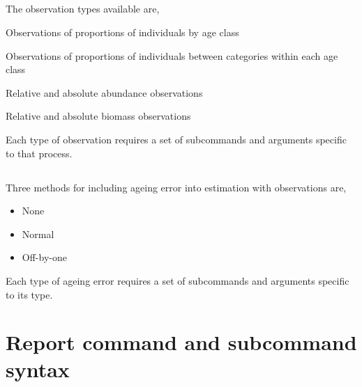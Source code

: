 
\subsection{}

The observation types available are,

\begin{description}
  \item Observations of proportions of individuals by age class
  \item Observations of proportions of individuals between categories within each age class
  \item Relative and absolute abundance observations
  \item Relative and absolute biomass observations
\end{description}

Each type of observation requires a set of subcommands and arguments specific to that process.



\subsection{}


\subsection{}

Three methods for including ageing error into estimation with observations are,

\begin{itemize}
	\item None
	\item Normal
	\item Off-by-one
\end{itemize}

Each type of ageing error requires a set of subcommands and arguments specific to its type.



\section{Report command and subcommand syntax\label{sec:report-syntax}}

